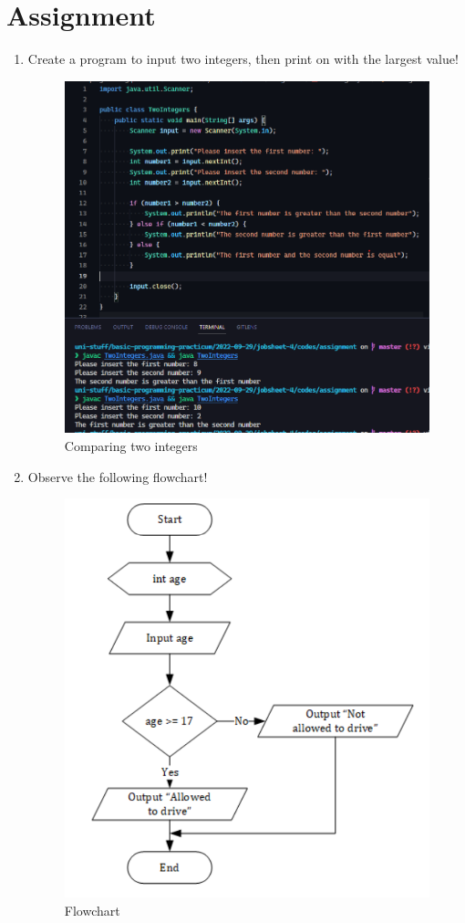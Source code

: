 \documentclass[12pt,titlepage]{article}
\begin{document}
\section{Assignment}
\begin{enumerate}
    \item {
        Create a program to input two integers, then print on with the largest value!

        \begin{figure}[h]
            \centering
            \includegraphics[width=.8\textwidth]{./images/two-integers.png}
            \caption{Comparing two integers}
        \end{figure}
    }
    \pagebreak
    \item {
        Observe the following flowchart!

        \begin{figure}[h]
            \centering
            \includegraphics[width=.8\textwidth]{./images/flowchart-2.png}
            \caption{Flowchart}
        \end{figure}

}
\end{enumerate}
\end{document}
